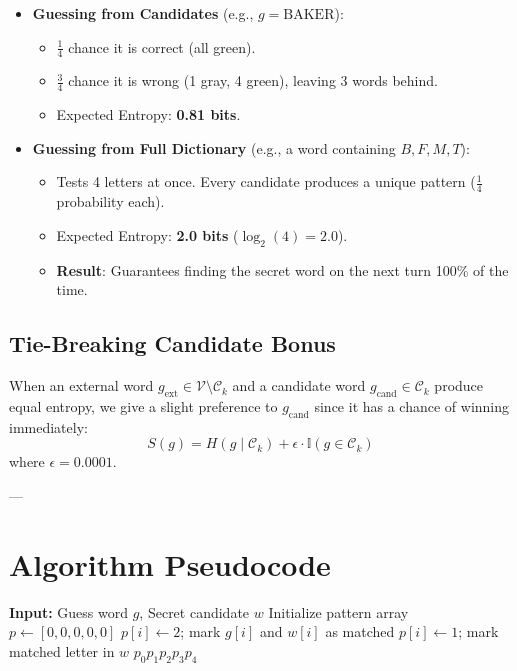 \documentclass[11pt,a4paper]{article}
\begin{document}
\begin{itemize}
    \item \textbf{Guessing from Candidates} (e.g., $g = \text{BAKER}$):
    \begin{itemize}
        \item $\frac{1}{4}$ chance it is correct (all green).
        \item $\frac{3}{4}$ chance it is wrong (1 gray, 4 green), leaving 3 words behind.
        \item Expected Entropy: \textbf{0.81 bits}.
    \end{itemize}
    \item \textbf{Guessing from Full Dictionary} (e.g., a word containing $B, F, M, T$):
    \begin{itemize}
        \item Tests 4 letters at once. Every candidate produces a unique pattern ($\frac{1}{4}$ probability each).
        \item Expected Entropy: \textbf{2.0 bits} ($\log_2(4) = 2.0$).
        \item \textbf{Result}: Guarantees finding the secret word on the next turn 100\% of the time.
    \end{itemize}
\end{itemize}

\subsection{Tie-Breaking Candidate Bonus}
When an external word $g_{\text{ext}} \in \mathcal{V} \setminus \mathcal{C}_k$ and a candidate word $g_{\text{cand}} \in \mathcal{C}_k$ produce equal entropy, we give a slight preference to $g_{\text{cand}}$ since it has a chance of winning immediately:
\begin{equation}
S(g) = H(g \mid \mathcal{C}_k) + \epsilon \cdot \mathbb{I}(g \in \mathcal{C}_k)
\end{equation}
where $\epsilon = 0.0001$.

---

\section{Algorithm Pseudocode}

\begin{algorithm}[H]
\caption{Feedback Pattern Matcher $f(g, w)$}
\begin{algorithmic}[1]
\State \textbf{Input:} Guess word $g$, Secret candidate $w$
\State Initialize pattern array $p \gets [0, 0, 0, 0, 0]$
\State {}
        \State $p[i] \gets 2$; mark $g[i]$ and $w[i]$ as matched
    \EndIf
\EndFor
\State {}
        \State $p[i] \gets 1$; mark matched letter in $w$
    \EndIf
\EndFor
\State \Return $p_0 p_1 p_2 p_3 p_4$
\end{algorithmic}
\end{algorithm}
\end{document}
